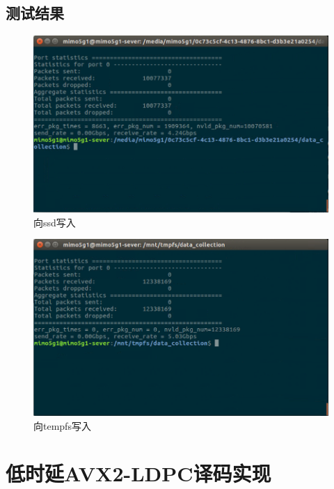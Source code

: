\documentclass{article}
\begin{document}
\subsection{测试结果}
\begin{figure}[H]
	\centering
	\includegraphics[width = .8\textwidth]{res5ssd.png}
	\caption{向ssd写入}
\end{figure}
\begin{figure}[H]
	\centering
	\includegraphics[width = .8\textwidth]{res5ram.png}
	\caption{向tempfs写入}
\end{figure}

\section{低时延AVX2-LDPC译码实现}
\end{document}
